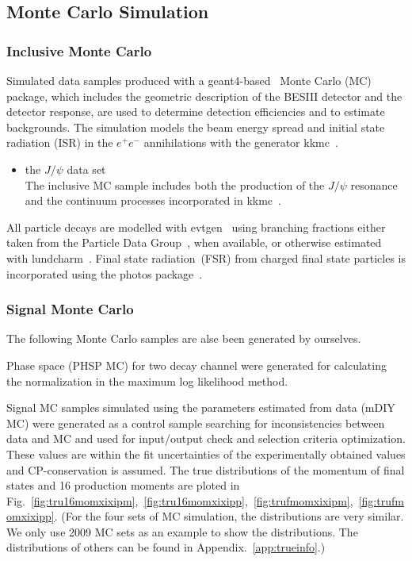 

\subsection{Monte Carlo Simulation}
\label{sec:mcsimulation}
\subsubsection{Inclusive Monte Carlo}

Simulated data samples produced with a {\sc
geant4}-based~\cite{geant4} Monte Carlo (MC) package, which
includes the geometric description of the BESIII detector and the
detector response, are used to determine detection efficiencies
and to estimate backgrounds. The simulation models the beam
energy spread and initial state radiation (ISR) in the $e^+e^-$
annihilations with the generator {\sc
kkmc}~\cite{ref:kkmc}. 

\begin{itemize}
\item {  the $J/\psi$ data set \\
The inclusive MC sample includes both the production of the $J/\psi$
resonance and the continuum processes incorporated in {\sc
		kkmc}~\cite{ref:kkmc}.}
\end{itemize}
All particle decays are modelled with {\sc
evtgen}~\cite{ref:evtgen} using branching fractions 
either taken from the
Particle Data Group~\cite{pdg}, when available,
or otherwise estimated with {\sc lundcharm}~\cite{ref:lundcharm}.
Final state radiation~(FSR)
from charged final state particles is incorporated using the {\sc
photos} package~\cite{photos}.

\subsubsection{Signal Monte Carlo}
The following Monte Carlo samples are alse been generated by ourselves.

Phase space (PHSP MC) for two decay channel were generated for calculating 
the normalization in the maximum log likelihood method.

Signal MC samples simulated using the parameters estimated from data (mDIY MC)
were generated as a control sample searching for inconsistencies between
data and MC and used for input/output check and selection criteria optimization.
These values  are within the fit uncertainties of the experimentally obtained 
values and CP-conservation is assumed. The true distributions of the momentum of 
final states and 16 production moments are ploted in Fig.~\ref{fig:tru16momxixipm},~\ref{fig:tru16momxixipp},~\ref{fig:trufmomxixipm},~\ref{fig:trufmomxixipp}.
(For the four sets of MC simulation, the distributions are very similar. We only use 2009 MC sets as 
an example to show the distributions. The distributions of others can be found in Appendix.~\ref{app:trueinfo}.)

